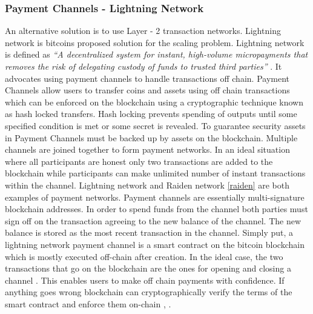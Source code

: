 \subsubsection{Payment Channels - Lightning Network} \label{LN}
An alternative solution is to use Layer - 2 transaction networks. Lightning network is bitcoins proposed solution for the scaling problem. Lightning network is defined as \textit{“A decentralized system for instant, high-volume micropayments that removes the risk of delegating custody of funds to trusted third parties”} \cite{paper:002}. It advocates using payment channels to handle transactions off chain. Payment Channels allow users to transfer coins and assets using off chain transactions which can be enforced on the blockchain using a cryptographic technique known as hash locked transfers. Hash locking prevents spending of outputs until some specified condition is met or some secret is revealed.  To guarantee security assets in Payment Channels must be backed up by assets on the blockchain. Multiple channels are joined together to form payment networks. In an ideal situation where all participants are honest only two transactions are added to the blockchain while participants can make unlimited number of instant transactions within the channel. Lightning network and Raiden network \ref{raiden} are both examples of payment networks. Payment channels are essentially multi-signature blockchain addresses. In order to spend funds from the channel both parties must sign off on the transaction agreeing to the new balance of the channel. The new balance is stored as the most recent transaction in the channel. Simply put, a lightning network payment channel is a smart contract on the bitcoin blockchain which is mostly executed off-chain after creation. In the ideal case, the two transactions that go on the blockchain are the ones for opening and closing a channel \cite{misc:011}. This enables users to make off chain payments with confidence. If anything goes wrong blockchain can cryptographically verify the terms of the smart contract and enforce them on-chain \cite{misc:012}, \cite{paper:002}.  
\vspace{0.5cm}  
